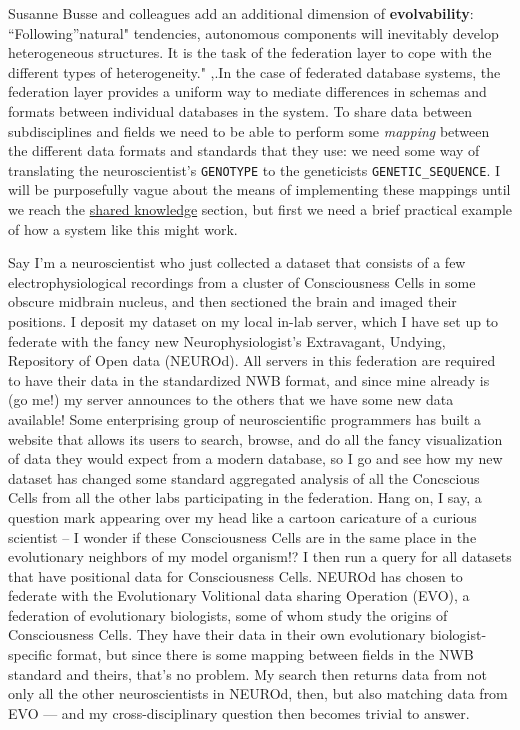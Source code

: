 \documentclass[nohyper]{tufte-book-jls}
\begin{document}
Susanne Busse and colleagues add an additional dimension of
\textbf{evolvability}: ``Following''natural" tendencies, autonomous
components will inevitably develop heterogeneous structures. It is the
task of the federation layer to cope with the different types of
heterogeneity." \cite{busseFederatedInformationSystems1999},.In
the case of federated database systems, the federation layer provides a
uniform way to mediate differences in schemas and formats between
individual databases in the system. To share data between subdisciplines
and fields we need to be able to perform some \emph{mapping} between the
different data formats and standards that they use: we need some way of
translating the neuroscientist's \texttt{GENOTYPE} to the geneticists
\texttt{GENETIC\_SEQUENCE}. I will be purposefully vague about the means
of implementing these mappings until we reach the
\protect\hyperlink{shared-knowledge}{shared knowledge} section, but
first we need a brief practical example of how a system like this might
work.

Say I'm a neuroscientist who just collected a dataset that consists of a
few electrophysiological recordings from a cluster of Consciousness
Cells in some obscure midbrain nucleus, and then sectioned the brain and
imaged their positions. I deposit my dataset on my local in-lab server,
which I have set up to federate with the fancy new Neurophysiologist's
Extravagant, Undying, Repository of Open data (NEUROd). All servers in
this federation are required to have their data in the standardized NWB
format, and since mine already is (go me!) my server announces to the
others that we have some new data available! Some enterprising group of
neuroscientific programmers has built a website that allows its users to
search, browse, and do all the fancy visualization of data they would
expect from a modern database, so I go and see how my new dataset has
changed some standard aggregated analysis of all the Concscious Cells
from all the other labs participating in the federation. Hang on, I say,
a question mark appearing over my head like a cartoon caricature of a
curious scientist -- I wonder if these Consciousness Cells are in the
same place in the evolutionary neighbors of my model organism!? I then
run a query for all datasets that have positional data for Consciousness
Cells. NEUROd has chosen to federate with the Evolutionary Volitional
data sharing Operation (EVO), a federation of evolutionary biologists,
some of whom study the origins of Consciousness Cells. They have their
data in their own evolutionary biologist-specific format, but since
there is some mapping between fields in the NWB standard and theirs,
that's no problem. My search then returns data from not only all the
other neuroscientists in NEUROd, then, but also matching data from EVO
--- and my cross-disciplinary question then becomes trivial to answer.
\end{document}
